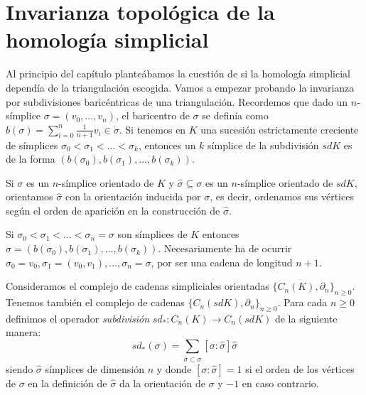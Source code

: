 \documentclass[HS.tex]{subfiles}
\begin{document}
\section{Invarianza topológica de la homología simplicial}

Al principio del capítulo planteábamos la cuestión de si la homología simplicial dependía de la triangulación escogida. Vamos a empezar probando la invarianza por subdivisiones baricéntricas de una triangulación. Recordemos que dado un $n$-símplice $\sigma=(v_0,\dots, v_n)$, el baricentro de $\sigma$ se definía como $b(\sigma)=\sum_{i=0}^n\frac{1}{n+1}v_i\in\mathring{\sigma}$. Si tenemos en $K$ una sucesión estrictamente creciente de símplices $\sigma_0<\sigma_1<\dots <\sigma_k$, entonces un $k$ símplice de la subdivisión $sdK$ es de la forma $(b(\sigma_0),b(\sigma_1),\dots, b(\sigma_k))$. 

Si $\sigma$ es un $n$-símplice orientado de $K$ y $\hat{\sigma}\subseteq\sigma$ es un $n$-símplice orientado de $sdK$, orientamos $\hat{\sigma}$ con la orientación inducida por $\sigma$, es decir, ordenamos sus vértices según el orden de aparición en la construcción de $\hat{\sigma
}$. 

Si $\sigma_0<\sigma_1<\dots<\sigma_n=\sigma$ son símplices de $K$ entonces $\hat{\sigma}=(b(\sigma_0),b(\sigma_1),\dots, b(\sigma_k))$. Necesariamente ha de ocurrir $\sigma_0=v_0, \sigma_1=(v_0,v_1), \dots, \sigma_n=\sigma$, por ser una cadena de longitud $n+1$. 


Consideramos el complejo de cadenas simpliciales orientadas $\{C_n(K),\partial_n\}_{n\geq 0}$. Tenemos también el complejo de cadenas $\{C_n(sdK),\partial_n\}_{n\geq 0}$. Para cada $n\geq 0$ definimos el operador \emph{subdivisión} $sd_*:C_n(K)\to C_n(sdK)$ de la siguiente manera:
\[
sd_*(\sigma)=\sum_{\hat{\sigma}\subset\sigma}[\sigma:\hat{\sigma}]\hat{\sigma}
\]
siendo $\hat{\sigma}$ símplices de dimensión $n$ y donde $[\sigma:\hat{\sigma}]=1$ si el orden de los vértices de $\sigma$ en la definición de $\hat{\sigma}$ da la orientación de $\sigma$ y $-1$ en caso contrario. 
\end{document}
